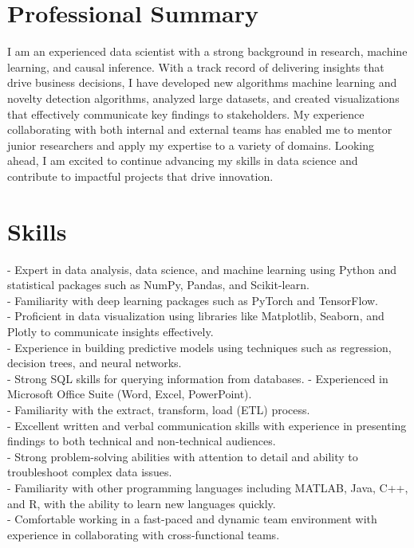 \documentclass[mm]{simple_style}
\begin{document}
\begin{resume}

	\section{Professional Summary}
	\par
	I am an experienced data scientist with a strong background in research, machine learning, and causal inference. With a track record of delivering insights that drive business decisions, I have developed new algorithms machine learning and novelty detection algorithms, analyzed large datasets, and created visualizations that effectively communicate key findings to stakeholders. My experience collaborating with both internal and external teams has enabled me to mentor junior researchers and apply my expertise to a variety of domains. Looking ahead, I am excited to continue advancing my skills in data science and contribute to impactful projects that drive innovation.
	
	\vspace{-2ex}
	\sectionline
	
	\section{Skills}
	
	- Expert in data analysis, data science, and machine learning using Python and statistical packages such as NumPy, Pandas, and Scikit-learn.\\
	- Familiarity with deep learning packages such as PyTorch and TensorFlow.\\
	- Proficient in data visualization using libraries like Matplotlib, Seaborn, and Plotly to communicate insights effectively.\\
	- Experience in building predictive models using techniques such as regression, decision trees, and neural networks.\\
	- Strong SQL skills for querying information from databases.
	- Experienced in Microsoft Office Suite (Word, Excel, PowerPoint).\\
	- Familiarity with the extract, transform, load (ETL) process.\\
	- Excellent written and verbal communication skills with experience in presenting findings to both technical and non-technical audiences.\\
	- Strong problem-solving abilities with attention to detail and ability to troubleshoot complex data issues.\\
	- Familiarity with other programming languages including MATLAB, Java, C++, and R, with the ability to learn new languages quickly.\\
	- Comfortable working in a fast-paced and dynamic team environment with experience in collaborating with cross-functional teams.\\
	

\end{resume}
\end{document}
